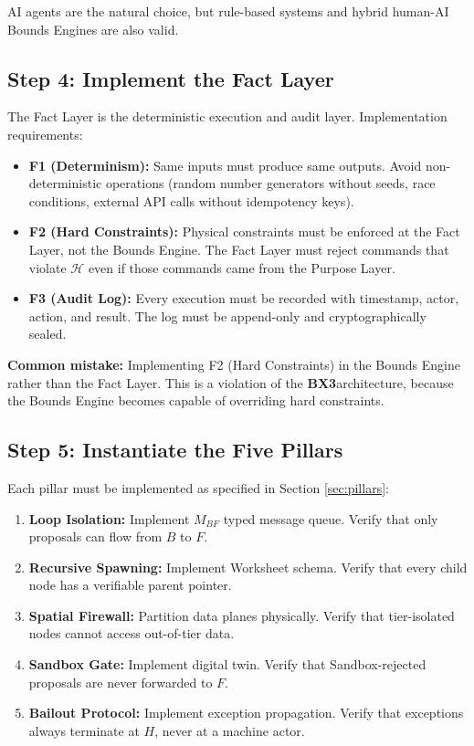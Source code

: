 \documentclass[12pt]{article}
\newcommand{\bxthree}{\textbf{BX3}}
\begin{document}
AI agents are the natural choice, but rule-based systems and hybrid human-AI Bounds Engines are also valid.

\subsection{Step 4: Implement the Fact Layer}
The Fact Layer is the deterministic execution and audit layer. Implementation requirements:

\begin{itemize}
\item \textbf{F1 (Determinism):} Same inputs must produce same outputs. Avoid non-deterministic operations (random number generators without seeds, race conditions, external API calls without idempotency keys).
\item \textbf{F2 (Hard Constraints):} Physical constraints must be enforced at the Fact Layer, not the Bounds Engine. The Fact Layer must reject commands that violate $\mathcal{H}$ even if those commands came from the Purpose Layer.
\item \textbf{F3 (Audit Log):} Every execution must be recorded with timestamp, actor, action, and result. The log must be append-only and cryptographically sealed.
\end{itemize}

\textbf{Common mistake:} Implementing F2 (Hard Constraints) in the Bounds Engine rather than the Fact Layer. This is a violation of the \bxthree architecture, because the Bounds Engine becomes capable of overriding hard constraints.

\subsection{Step 5: Instantiate the Five Pillars}
Each pillar must be implemented as specified in Section \ref{sec:pillars}:

\begin{enumerate}
\item \textbf{Loop Isolation:} Implement $M_{BF}$ typed message queue. Verify that only proposals can flow from $B$ to $F$.
\item \textbf{Recursive Spawning:} Implement Worksheet schema. Verify that every child node has a verifiable parent pointer.
\item \textbf{Spatial Firewall:} Partition data planes physically. Verify that tier-isolated nodes cannot access out-of-tier data.
\item \textbf{Sandbox Gate:} Implement digital twin. Verify that Sandbox-rejected proposals are never forwarded to $F$.
\item \textbf{Bailout Protocol:} Implement exception propagation. Verify that exceptions always terminate at $H$, never at a machine actor.
\end{enumerate}
\end{document}
